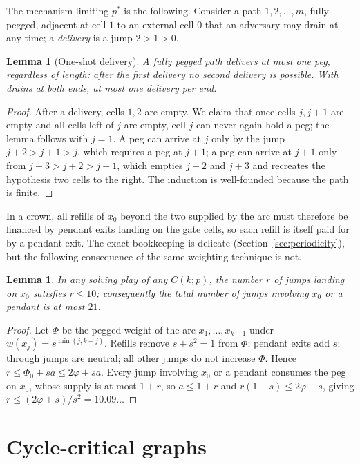 \documentclass[11pt]{article}
\newtheorem{lemma}[theorem]{Lemma}
\theoremstyle{definition}
\begin{document}
The mechanism limiting $p^*$ is the following. Consider a
path $1,2,\dots,m$, fully pegged, adjacent at cell $1$ to an external
cell $0$ that an adversary may drain at any time; a \emph{delivery}
is a jump $2\!>\!1\!>\!0$.

\begin{lemma}[One-shot delivery]\label{lem:oneshot}
A fully pegged path delivers at most one peg, regardless of length:
after the first delivery no second delivery is possible. With drains
at both ends, at most one delivery per end.
\end{lemma}

\begin{proof}
After a delivery, cells $1,2$ are empty. We claim that once cells
$j,j+1$ are empty and all cells left of $j$ are empty, cell $j$ can
never again hold a peg; the lemma follows with $j=1$. A peg can
arrive at $j$ only by the jump $j{+}2\!>\!j{+}1\!>\!j$, which
requires a peg at $j+1$; a peg can arrive at $j+1$ only from
$j{+}3\!>\!j{+}2\!>\!j{+}1$, which empties $j+2$ and $j+3$ and
recreates the hypothesis two cells to the right. The induction is
well-founded because the path is finite.
\end{proof}

In a crown, all refills of $x_0$ beyond the two supplied by the arc
must therefore be financed by pendant exits landing on the gate
cells, so each refill is itself paid for by a pendant exit. The
exact bookkeeping is delicate (Section~\ref{sec:periodicity}), but
the following consequence of the same weighting technique is not.

\begin{lemma}\label{lem:refills}
In any solving play of any $C(k;p)$, the number $r$ of jumps landing
on $x_0$ satisfies $r\le 10$; consequently the total number of jumps
involving $x_0$ or a pendant is at most $21$.
\end{lemma}

\begin{proof}
Let $\Phi$ be the pegged weight of the arc $x_1,\dots,x_{k-1}$ under
$w(x_j)=s^{\min(j,k-j)}$. Refills remove $s+s^2=1$ from $\Phi$;
pendant exits add $s$; through jumps are neutral; all other jumps do
not increase $\Phi$. Hence $r\le\Phi_0+sa\le2\varphi+sa$. Every
jump involving $x_0$ or a pendant consumes the peg on $x_0$, whose
supply is at most $1+r$, so $a\le1+r$ and
$r(1-s)\le2\varphi+s$, giving $r\le(2\varphi+s)/s^2=10.09\ldots$
\end{proof}

\section{Cycle-critical graphs}\label{sec:critical}
\end{document}
